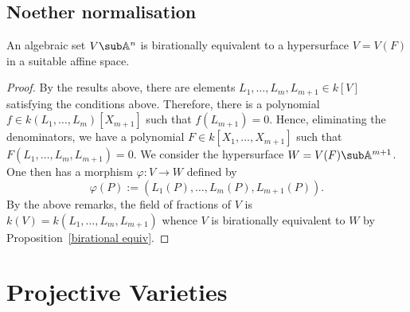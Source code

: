 \subsection{Noether normalisation}
\begin{proposition}\label{hypersurface reduction}
An algebraic set $V\sub\mathbb{A}^n$ is birationally equivalent to a hypersurface $V=V(F)$ in a suitable affine space.
\end{proposition}
\begin{proof}
By the results above, there are elements $L_1,\dots,L_{m},L_{m+1}\in k[V]$ satisfying the conditions above. Therefore, there is a polynomial $f\in k(L_1,\dots,L_m)[X_{m+1}]$ such that $f(L_{m+1})=0$. Hence, eliminating the denominators, we have a polynomial $F\in k[X_1,\dots,X_{m+1}]$ such that $F(L_1,\dots,L_m,L_{m+1})=0$. We consider the hypersurface $W=V(F)\sub\mathbb{A}^{m+1}$. One then has a morphism $\varphi:V\to W$ defined by
\[\varphi(P):=(L_1(P),\dots,L_m(P),L_{m+1}(P)).\]
By the above remarks, the field of fractions of $V$ is $k(V)=k(L_1,\dots,L_m,L_{m+1})$ whence $V$ is birationally equivalent to $W$ by Proposition~\ref{birational equiv}.
\end{proof}
\section{Projective Varieties}
